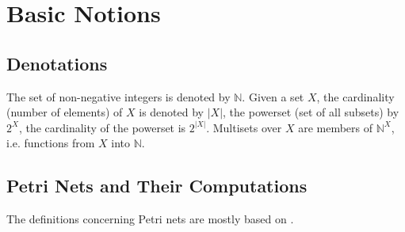 \documentclass[a4paper]{llncs}
\begin{document}
\section{Basic Notions}

\subsection{Denotations}
The set of non-negative integers is denoted by $\mathbb{N}$. Given a set $X$, the cardinality (number of elements) of $X$ is denoted by $|X|$, the powerset (set of all subsets) by $2^X$, the cardinality of the powerset is $2^{|X|}$. Multisets over $X$ are members of  $\mathbb{N}^X$, i.e. functions from $X$ into $\mathbb{N}$.

\subsection{Petri Nets and Their Computations}

The definitions concerning Petri nets are mostly based on \cite{DeselReisig}.
\end{document}
